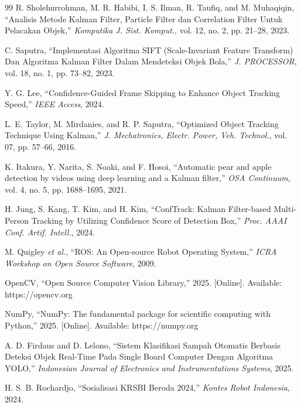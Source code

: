 \documentclass[12pt,a4paper]{article}
\begin{document}
\begin{thebibliography}{99}
 R. Sholehurrohman, M. R. Habibi, I. S. Ilman, R. Taufiq, and M. Muhaqiqin, ``Analisis Metode Kalman Filter, Particle Filter dan Correlation Filter Untuk Pelacakan Objek,'' \textit{Komputika J. Sist. Komput.}, vol. 12, no. 2, pp. 21–28, 2023.

 C. Saputra, ``Implementasi Algoritma SIFT (Scale-Invariant Feature Transform) Dan Algoritma Kalman Filter Dalam Mendeteksi Objek Bola,'' \textit{J. PROCESSOR}, vol. 18, no. 1, pp. 73–82, 2023.

 Y. G. Lee, ``Confidence-Guided Frame Skipping to Enhance Object Tracking Speed,'' \textit{IEEE Access}, 2024.

 L. E. Taylor, M. Mirdanies, and R. P. Saputra, ``Optimized Object Tracking Technique Using Kalman,'' \textit{J. Mechatronics, Electr. Power, Veh. Technol.}, vol. 07, pp. 57–66, 2016.

 K. Itakura, Y. Narita, S. Noaki, and F. Hosoi, ``Automatic pear and apple detection by videos using deep learning and a Kalman filter,'' \textit{OSA Continuum}, vol. 4, no. 5, pp. 1688–1695, 2021.

 H. Jung, S. Kang, T. Kim, and H. Kim, ``ConfTrack: Kalman Filter-based Multi-Person Tracking by Utilizing Confidence Score of Detection Box,'' \textit{Proc. AAAI Conf. Artif. Intell.}, 2024.

 M. Quigley \textit{et al.}, ``ROS: An Open-source Robot Operating System,'' \textit{ICRA Workshop on Open Source Software}, 2009.

 OpenCV, ``Open Source Computer Vision Library,'' 2025. [Online]. Available: https://opencv.org

 NumPy, ``NumPy: The fundamental package for scientific computing with Python,'' 2025. [Online]. Available: https://numpy.org

 A. D. Firdaus and D. Lelono, ``Sistem Klasifikasi Sampah Otomatis Berbasis Deteksi Objek Real-Time Pada Single Board Computer Dengan Algoritma YOLO,'' \textit{Indonesian Journal of Electronics and Instrumentations Systems}, 2025.

 H. S. B. Rochardjo, ``Sosialisasi KRSBI Beroda 2024,'' \textit{Kontes Robot Indonesia}, 2024.

\end{thebibliography}

\end{document}
